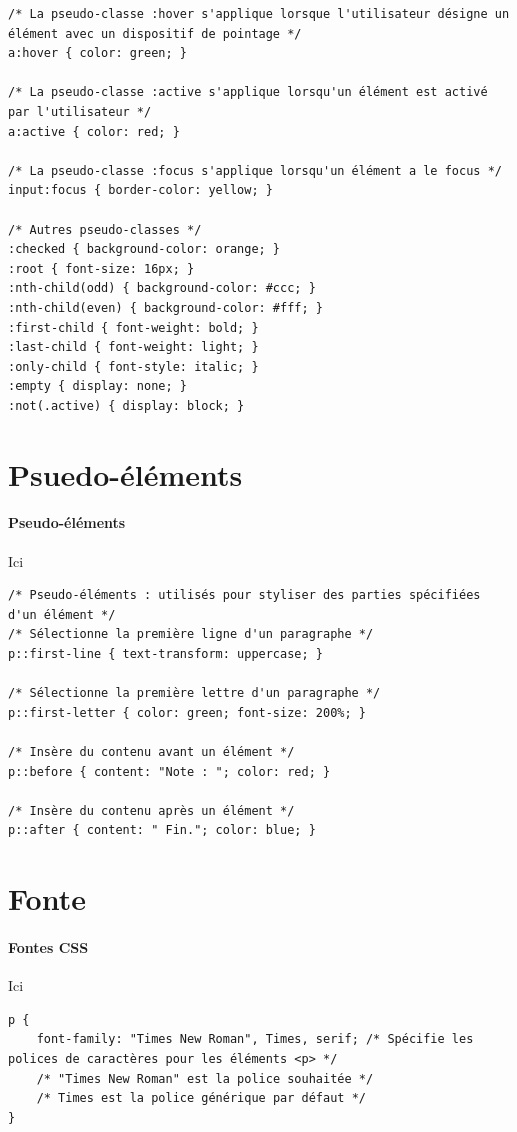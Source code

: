 \documentclass{report}
\begin{document}
\begin{multicols*}{2}
\begin{lstlisting}[style=CSSDraculaLight]
/* La pseudo-classe :hover s'applique lorsque l'utilisateur désigne un élément avec un dispositif de pointage */
a:hover { color: green; }

/* La pseudo-classe :active s'applique lorsqu'un élément est activé par l'utilisateur */
a:active { color: red; }

/* La pseudo-classe :focus s'applique lorsqu'un élément a le focus */
input:focus { border-color: yellow; }

/* Autres pseudo-classes */
:checked { background-color: orange; }
:root { font-size: 16px; }
:nth-child(odd) { background-color: #ccc; }
:nth-child(even) { background-color: #fff; }
:first-child { font-weight: bold; }
:last-child { font-weight: light; }
:only-child { font-style: italic; }
:empty { display: none; }
:not(.active) { display: block; }
\end{lstlisting}

\section{Psuedo-éléments}

\paragraph{Pseudo-éléments} Ici

\begin{lstlisting}[style=CSSDraculaLight]
/* Pseudo-éléments : utilisés pour styliser des parties spécifiées d'un élément */
/* Sélectionne la première ligne d'un paragraphe */
p::first-line { text-transform: uppercase; }

/* Sélectionne la première lettre d'un paragraphe */
p::first-letter { color: green; font-size: 200%; }

/* Insère du contenu avant un élément */
p::before { content: "Note : "; color: red; }

/* Insère du contenu après un élément */
p::after { content: " Fin."; color: blue; }
\end{lstlisting}



\section{Fonte}
\paragraph{Fontes CSS} Ici 
 \begin{lstlisting}[style=CSSDraculaLight]
p {
    font-family: "Times New Roman", Times, serif; /* Spécifie les polices de caractères pour les éléments <p> */
    /* "Times New Roman" est la police souhaitée */
    /* Times est la police générique par défaut */
}
\end{lstlisting}




\end{multicols*}
\end{document}
